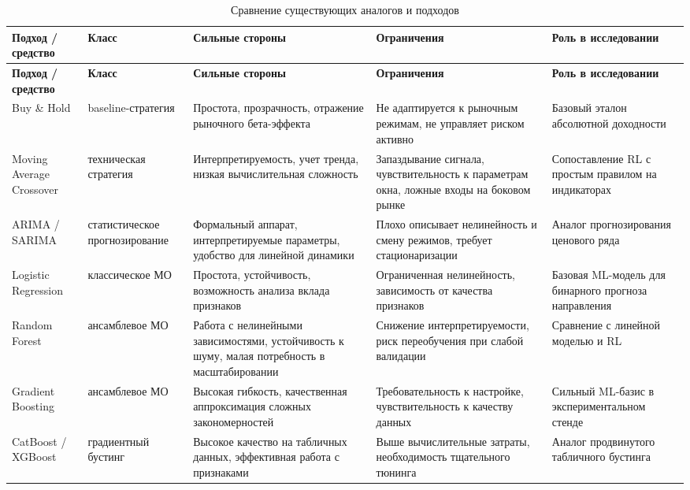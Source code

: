 \begin{center}
\small
\begin{longtable}{|p{2.6cm}|p{2.3cm}|p{3.6cm}|p{3.8cm}|p{3.2cm}|}
\caption{Сравнение существующих аналогов и подходов}\label{tab:analogs_comparison}\\
\hline
\textbf{Подход / средство} & \textbf{Класс} & \textbf{Сильные стороны} & \textbf{Ограничения} & \textbf{Роль в исследовании} \\
\hline
\endfirsthead
\hline
\textbf{Подход / средство} & \textbf{Класс} & \textbf{Сильные стороны} & \textbf{Ограничения} & \textbf{Роль в исследовании} \\
\hline
\endhead
Buy \& Hold & baseline-стратегия & Простота, прозрачность, отражение рыночного бета-эффекта & Не адаптируется к рыночным режимам, не управляет риском активно & Базовый эталон абсолютной доходности \\
\hline
Moving Average Crossover & техническая стратегия & Интерпретируемость, учет тренда, низкая вычислительная сложность & Запаздывание сигнала, чувствительность к параметрам окна, ложные входы на боковом рынке & Сопоставление RL с простым правилом на индикаторах \\
\hline
ARIMA / SARIMA & статистическое прогнозирование & Формальный аппарат, интерпретируемые параметры, удобство для линейной динамики & Плохо описывает нелинейность и смену режимов, требует стационаризации & Аналог прогнозирования ценового ряда \\
\hline
Logistic Regression & классическое МО & Простота, устойчивость, возможность анализа вклада признаков & Ограниченная нелинейность, зависимость от качества признаков & Базовая ML-модель для бинарного прогноза направления \\
\hline
Random Forest & ансамблевое МО & Работа с нелинейными зависимостями, устойчивость к шуму, малая потребность в масштабировании & Снижение интерпретируемости, риск переобучения при слабой валидации & Сравнение с линейной моделью и RL \\
\hline
Gradient Boosting & ансамблевое МО & Высокая гибкость, качественная аппроксимация сложных закономерностей & Требовательность к настройке, чувствительность к качеству данных & Сильный ML-базис в экспериментальном стенде \\
\hline
CatBoost / XGBoost & градиентный бустинг & Высокое качество на табличных данных, эффективная работа с признаками & Выше вычислительные затраты, необходимость тщательного тюнинга & Аналог продвинутого табличного бустинга \\

\end{longtable}
\end{center}
